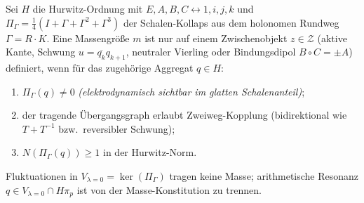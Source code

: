 \begin{axiom}
Sei $H$ die Hurwitz-Ordnung mit $E,A,B,C\leftrightarrow 1,i,j,k$ und
$\Pi_\Gamma=\frac14(I+\Gamma+\Gamma^2+\Gamma^3)$ der Schalen-Kollaps aus dem holonomen
Rundweg $\Gamma=R\cdot K$.
Eine Massengröße $m$ ist nur auf einem Zwischenobjekt
$z\in\mathcal{Z}$ (aktive Kante, Schwung $u=\overline{q_k}q_{k+1}$, neutraler Vierling
oder Bindungsdipol $B\circ C=\pm A$) definiert, wenn für das zugehörige Aggregat $q\in H$:
\begin{enumerate}
  \item $\Pi_\Gamma(q)\neq 0$ \emph{(elektrodynamisch sichtbar im glatten Schalenanteil)};
  \item der tragende Übergangsgraph erlaubt Zweiweg-Kopplung
        (bidirektional wie $T+T^{-1}$ bzw.\ reversibler Schwung);
  \item $N(\Pi_\Gamma(q))\ge 1$ in der Hurwitz-Norm.
\end{enumerate}
Fluktuationen in $V_{\lambda=0}=\ker(\Pi_\Gamma)$ tragen keine Masse;
arithmetische Resonanz $q\in V_{\lambda=0}\cap H\pi_p$ ist von der Masse-Konstitution zu trennen.
\end{axiom}
